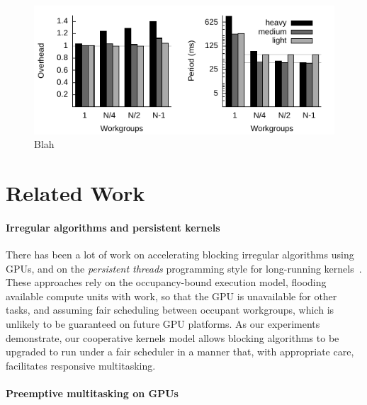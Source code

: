 \documentclass[numbers,nocopyrightspace,10pt]{sigplanconf}
\begin{document}
\begin{figure}
\includegraphics[width=\columnwidth]{heavy.pdf} 
\caption{Blah}\label{fig:blah}
\end{figure}


\section{Related Work}\label{sec:relatedwork}

\paragraph{Irregular algorithms and persistent kernels}

There has been a lot of work on accelerating blocking irregular
algorithms using GPUs, and on the \emph{persistent threads}
programming style for long-running
kernels~\cite{owens-persistent,DBLP:conf/ipps/KaleemVPHP16,DBLP:conf/ipps/DavidsonBGO14,DBLP:conf/hipc/HarishN07,DBLP:journals/topc/MerrillGG15,DBLP:conf/egh/VineetHPN09,DBLP:conf/ppopp/NobariCKB12,DBLP:conf/hpcc/SolomonTT10a,DBLP:conf/popl/PrabhuRMH11,DBLP:conf/ppopp/Mendez-LojoBP12,DBLP:conf/oopsla/PaiP16,DBLP:conf/oopsla/SorensenDBGR16,DBLP:conf/egh/CedermanT08,TPO10,BNP12,Pannotia}.
These approaches rely on the occupancy-bound execution model, flooding
available compute units with work, so that the GPU is unavailable for
other tasks, and assuming fair scheduling between occupant workgroups,
which is unlikely to be guaranteed on future GPU platforms.
%
As our experiments demonstrate, our cooperative kernels model allows blocking algorithms
to be upgraded to run under a fair scheduler in a manner that, with
appropriate care, facilitates responsive multitasking.

\paragraph{Preemptive multitasking on GPUs}
\end{document}
